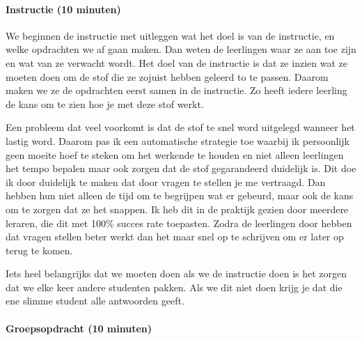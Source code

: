\documentclass{article}
\begin{document}
                \bigskip\noindent\paragraph{Instructie (10 minuten)}

                    We beginnen de instructie met uitleggen wat het doel is van de instructie, en welke opdrachten we af gaan maken. Dan weten de leerlingen waar ze aan toe zijn en wat van ze verwacht wordt. Het doel van de instructie is dat ze inzien wat ze moeten doen om de stof die ze zojuist hebben geleerd to te passen. Daarom maken we ze de opdrachten eerst samen in de instructie. Zo heeft iedere leerling de kans om te zien hoe je met deze stof werkt.

                    Een probleem dat veel voorkomt is dat de stof te snel word uitgelegd wanneer het lastig word. Daarom pas ik een automatische strategie toe waarbij ik persoonlijk geen moeite hoef te steken om het werkende te houden en niet alleen leerlingen het tempo bepalen maar ook zorgen dat de stof gegarandeerd duidelijk is. Dit doe ik door duidelijk te maken dat door vragen te stellen je me vertraagd. Dan hebben hun niet alleen de tijd om te begrijpen wat er gebeurd, maar ook de kans om te zorgen dat ze het snappen. Ik heb dit in de praktijk gezien door meerdere leraren, die dit met 100\% succes rate toepasten.\cite{succesfull-instructions} Zodra de leerlingen door hebben dat vragen stellen beter werkt dan het maar snel op te schrijven om er later op terug te komen.

                    Iets heel belangrijks dat we moeten doen als we de instructie doen is het zorgen dat we elke keer andere studenten pakken. Als we dit niet doen krijg je dat die ene slimme student alle antwoorden geeft. 
                
                \bigskip\noindent\paragraph{Groepsopdracht (10 minuten)}
                    
\end{document}
